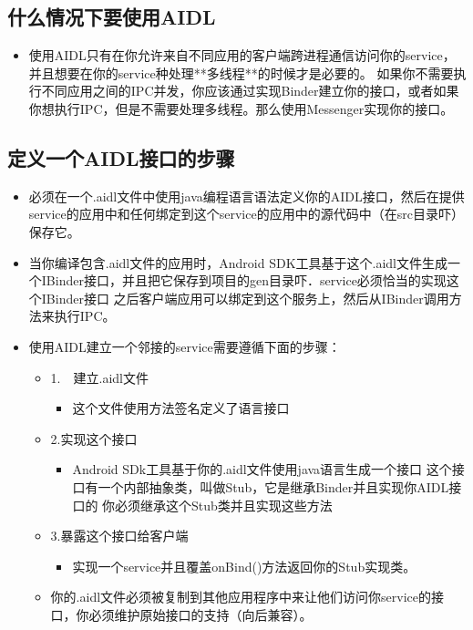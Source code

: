 \documentclass[9pt, b5paper]{article}
\begin{document}
\subsection{什么情况下要使用AIDL}
\label{sec-6-2}
\begin{itemize}
\item 使用AIDL只有在你允许来自不同应用的客户端跨进程通信访问你的service，并且想要在你的service种处理**多线程**的时候才是必要的。 如果你不需要执行不同应用之间的IPC并发，你应该通过实现Binder建立你的接口，或者如果你想执行IPC，但是不需要处理多线程。那么使用Messenger实现你的接口。
\end{itemize}
\subsection{定义一个AIDL接口的步骤}
\label{sec-6-3}
\begin{itemize}
\item 必须在一个.aidl文件中使用java编程语言语法定义你的AIDL接口，然后在提供service的应用中和任何绑定到这个service的应用中的源代码中（在src目录吓）保存它。
\item 当你编译包含.aidl文件的应用时，Android SDK工具基于这个.aidl文件生成一个IBinder接口，并且把它保存到项目的gen目录吓．service必须恰当的实现这个IBinder接口 之后客户端应用可以绑定到这个服务上，然后从IBinder调用方法来执行IPC。
\item 使用AIDL建立一个邻接的service需要遵循下面的步骤：
\begin{itemize}
\item 1.　建立.aidl文件　
\begin{itemize}
\item 这个文件使用方法签名定义了语言接口　
\end{itemize}
\item 2.实现这个接口　
\begin{itemize}
\item Android SDk工具基于你的.aidl文件使用java语言生成一个接口 这个接口有一个内部抽象类，叫做Stub，它是继承Binder并且实现你AIDL接口的 你必须继承这个Stub类并且实现这些方法
\end{itemize}
\item 3.暴露这个接口给客户端　
\begin{itemize}
\item 实现一个service并且覆盖onBind()方法返回你的Stub实现类。
\end{itemize}
\item 你的.aidl文件必须被复制到其他应用程序中来让他们访问你service的接口，你必须维护原始接口的支持（向后兼容）。
\end{itemize}
\end{itemize}
\end{document}
